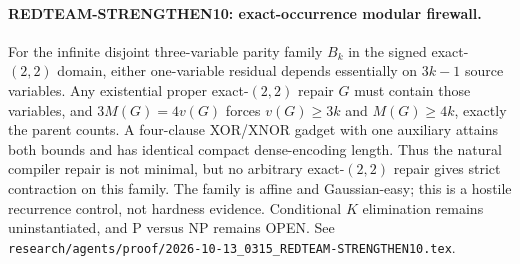 \paragraph{REDTEAM-STRENGTHEN10: exact-occurrence modular firewall.}
For the infinite disjoint three-variable parity family $B_k$ in the signed
exact-$(2,2)$ domain, either one-variable residual depends essentially on
$3k-1$ source variables.  Any existential proper exact-$(2,2)$ repair $G$
must contain those variables, and $3M(G)=4v(G)$ forces
$v(G)\ge3k$ and $M(G)\ge4k$, exactly the parent counts.  A four-clause
XOR/XNOR gadget with one auxiliary attains both bounds and has identical
compact dense-encoding length.  Thus the natural compiler repair is not
minimal, but no arbitrary exact-$(2,2)$ repair gives strict contraction on
this family.  The family is affine and Gaussian-easy; this is a hostile
recurrence control, not hardness evidence.  Conditional $K$ elimination
remains uninstantiated, and P versus NP remains OPEN.  See
\texttt{research/agents/proof/2026-10-13\_0315\_REDTEAM-STRENGTHEN10.tex}.
